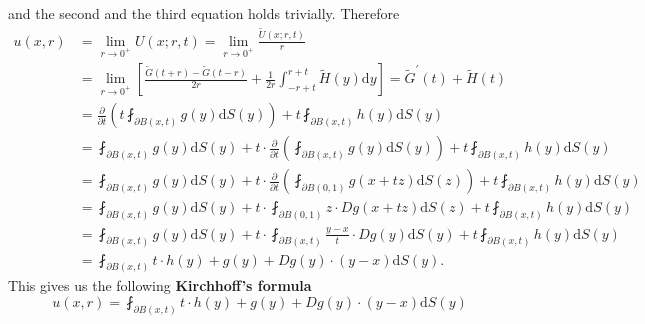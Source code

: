 and the second and the third equation holds trivially. Therefore 
\begin{equation}\label{1.95}
\begin{aligned}
u\left( x,r \right) &=\lim_{r\rightarrow 0^+} U\left( x;r,t \right) =\lim_{r\rightarrow 0^+} \frac{\widetilde{U}\left( x;r,t \right)}{r}
\\
&=\lim_{r\rightarrow 0^+} \left[ \frac{\widetilde{G}\left( t+r \right) -\widetilde{G}\left( t-r \right)}{2r}+\frac{1}{2r}\int_{-r+t}^{r+t}{\widetilde{H}\left( y \right) \mathrm{d}y} \right] =\widetilde{G}^{\prime}\left( t \right) +\widetilde{H}\left( t \right) 
\\
&=\frac{\partial}{\partial t}\left( t\fint_{\partial B\left( x,t \right)}{g\left( y \right) \mathrm{d}S\left( y \right)} \right) +t\fint_{\partial B\left( x,t \right)}{h\left( y \right) \mathrm{d}S\left( y \right)}
\\
&=\fint_{\partial B\left( x,t \right)}{g\left( y \right) \mathrm{d}S\left( y \right)}+t\cdot \frac{\partial}{\partial t}\left( \fint_{\partial B\left( x,t \right)}{g\left( y \right) \mathrm{d}S\left( y \right)} \right) +t\fint_{\partial B\left( x,t \right)}{h\left( y \right) \mathrm{d}S\left( y \right)}
\\
&=\fint_{\partial B\left( x,t \right)}{g\left( y \right) \mathrm{d}S\left( y \right)}+t\cdot \frac{\partial}{\partial t}\left( \fint_{\partial B\left( 0,1 \right)}{g\left( x+tz \right) \mathrm{d}S\left( z \right)} \right) +t\fint_{\partial B\left( x,t \right)}{h\left( y \right) \mathrm{d}S\left( y \right)}
\\
&=\fint_{\partial B\left( x,t \right)}{g\left( y \right) \mathrm{d}S\left( y \right)}+t\cdot \fint_{\partial B\left( 0,1 \right)}{z\cdot Dg\left( x+tz \right) \mathrm{d}S\left( z \right)}+t\fint_{\partial B\left( x,t \right)}{h\left( y \right) \mathrm{d}S\left( y \right)}
\\
&=\fint_{\partial B\left( x,t \right)}{g\left( y \right) \mathrm{d}S\left( y \right)}+t\cdot \fint_{\partial B\left( x,t \right)}{\frac{y-x}{t}\cdot Dg\left( y \right) \mathrm{d}S\left( y \right)}+t\fint_{\partial B\left( x,t \right)}{h\left( y \right) \mathrm{d}S\left( y \right)}
\\
&=\fint_{\partial B\left( x,t \right)}{t\cdot h\left( y \right) +g\left( y \right) +Dg\left( y \right) \cdot \left( y-x \right) \mathrm{d}S\left( y \right)}.
\end{aligned}
\end{equation}
This gives us the following \textbf{Kirchhoff's formula} 
$$
u\left( x,r \right) =\fint_{\partial B\left( x,t \right)}{t\cdot h\left( y \right) +g\left( y \right) +Dg\left( y \right) \cdot \left( y-x \right) \mathrm{d}S\left( y \right)}
$$
